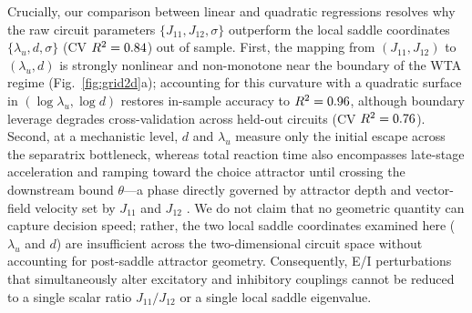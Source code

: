 \documentclass[11pt]{article}
\begin{document}
	Crucially, our comparison between linear and quadratic regressions resolves why the raw circuit parameters $\{J_{11},J_{12},\sigma\}$ outperform the local saddle coordinates $\{\lambda_u,d,\sigma\}$ (CV $R^2=0.84$) out of sample. First, the mapping from $(J_{11},J_{12})$ to $(\lambda_u,d)$ is strongly nonlinear and non-monotone near the boundary of the WTA regime (Fig.~\ref{fig:grid2d}a); accounting for this curvature with a quadratic surface in $(\log\lambda_u,\log d)$ restores in-sample accuracy to $R^2=0.96$, although boundary leverage degrades cross-validation across held-out circuits (CV $R^2=0.76$). Second, at a mechanistic level, $d$ and $\lambda_u$ measure only the initial escape across the separatrix bottleneck, whereas total reaction time also encompasses late-stage acceleration and ramping toward the choice attractor until crossing the downstream bound $\theta$---a phase directly governed by attractor depth and vector-field velocity set by $J_{11}$ and $J_{12}$ \citep{WongWang2006, WongHuk2008, Standage2011, Niyogi2013}. We do not claim that no geometric quantity can capture decision speed; rather, the two local saddle coordinates examined here ($\lambda_u$ and $d$) are insufficient across the two-dimensional circuit space without accounting for post-saddle attractor geometry. Consequently, E/I perturbations that simultaneously alter excitatory and inhibitory couplings \citep{Murray2014, Lam2022} cannot be reduced to a single scalar ratio $J_{11}/J_{12}$ or a single local saddle eigenvalue.
	
\end{document}
